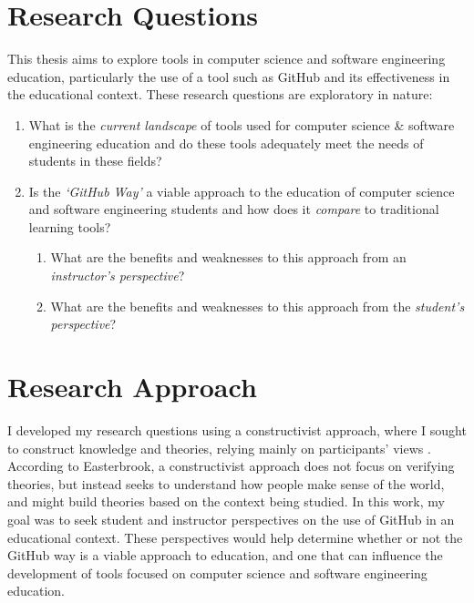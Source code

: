 \section{Research Questions}
This thesis aims to explore tools in computer science and software engineering education, particularly the use of a tool such as GitHub and its effectiveness in the educational context. These research questions are exploratory in nature: \\
\begin{enumerate}
\item What is the \emph{current landscape} of tools used for computer science \& software engineering education and do these tools adequately meet the needs of students in these fields?
\item Is the \emph{`GitHub Way'} a viable approach to the education of computer science and software engineering students and how does it \emph{compare} to traditional learning tools?
\begin{enumerate}
    \item What are the benefits and weaknesses to this approach from an \emph{instructor's perspective}?
    \item What are the benefits and weaknesses to this approach from the \emph{student's perspective}?
\end{enumerate}
\end{enumerate}

\section{Research Approach}
I developed my research questions using a constructivist approach, where I sought to construct knowledge and theories, relying mainly on participants' views \cite{easterbrook2008selecting}. According to Easterbrook, a constructivist approach does not focus on verifying theories, but instead seeks to understand how people make sense of the world, and might build theories based on the context being studied. In this work, my goal was to seek student and instructor perspectives on the use of GitHub in an educational context. These perspectives would help determine whether or not the GitHub way is a viable approach to education, and one that can influence the development of tools focused on computer science and software engineering education.


